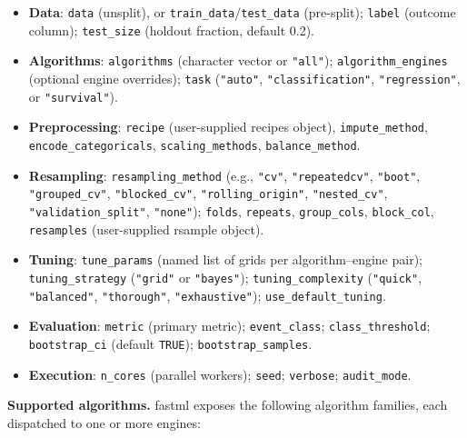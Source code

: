\begin{itemize}
\tightlist
\item
  \textbf{Data}: \texttt{data} (unsplit), or \texttt{train\_data}/\texttt{test\_data} (pre-split); \texttt{label} (outcome column); \texttt{test\_size} (holdout fraction, default 0.2).
\item
  \textbf{Algorithms}: \texttt{algorithms} (character vector or \texttt{"all"}); \texttt{algorithm\_engines} (optional engine overrides); \texttt{task} (\texttt{"auto"}, \texttt{"classification"}, \texttt{"regression"}, or \texttt{"survival"}).
\item
  \textbf{Preprocessing}: \texttt{recipe} (user-supplied recipes object), \texttt{impute\_method}, \texttt{encode\_categoricals}, \texttt{scaling\_methods}, \texttt{balance\_method}.
\item
  \textbf{Resampling}: \texttt{resampling\_method} (e.g., \texttt{"cv"}, \texttt{"repeatedcv"}, \texttt{"boot"}, \texttt{"grouped\_cv"}, \texttt{"blocked\_cv"}, \texttt{"rolling\_origin"}, \texttt{"nested\_cv"}, \texttt{"validation\_split"}, \texttt{"none"}); \texttt{folds}, \texttt{repeats}, \texttt{group\_cols}, \texttt{block\_col}, \texttt{resamples} (user-supplied rsample object).
\item
  \textbf{Tuning}: \texttt{tune\_params} (named list of grids per algorithm--engine pair); \texttt{tuning\_strategy} (\texttt{"grid"} or \texttt{"bayes"}); \texttt{tuning\_complexity} (\texttt{"quick"}, \texttt{"balanced"}, \texttt{"thorough"}, \texttt{"exhaustive"}); \texttt{use\_default\_tuning}.
\item
  \textbf{Evaluation}: \texttt{metric} (primary metric); \texttt{event\_class}; \texttt{class\_threshold}; \texttt{bootstrap\_ci} (default \texttt{TRUE}); \texttt{bootstrap\_samples}.
\item
  \textbf{Execution}: \texttt{n\_cores} (parallel workers); \texttt{seed}; \texttt{verbose}; \texttt{audit\_mode}.
\end{itemize}

\textbf{Supported algorithms.} fastml exposes the following algorithm families, each dispatched to one or more engines:

